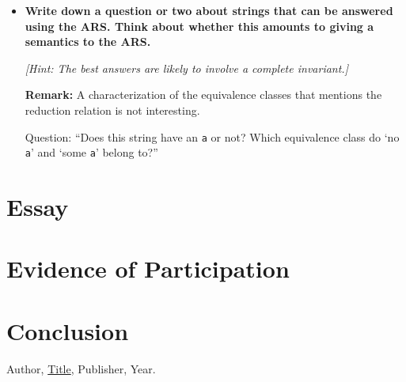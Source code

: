 \documentclass{article}
\theoremstyle{theorem}
\theoremstyle{definition}
\theoremstyle{remark}
\begin{document}
\begin{itemize}
  \item \textbf{Write down a question or two about strings that can be answered using the ARS. Think about whether this amounts to giving a semantics to the ARS.}

  \textit{[Hint: The best answers are likely to involve a complete invariant.]}

  \textbf{Remark:} A characterization of the equivalence classes that mentions the reduction relation is not interesting.

  Question: “Does this string have an \texttt{a} or not? Which equivalence class do ‘no \texttt{a}’ and ‘some \texttt{a}’ belong to?”
\end{itemize}


\section{Essay}

\section{Evidence of Participation}

\section{Conclusion}\label{conclusion}

\begin{thebibliography}{99}
 Author, \href{https://en.wikipedia.org/wiki/LaTeX}{Title}, Publisher, Year.
\end{thebibliography}
\end{document}
